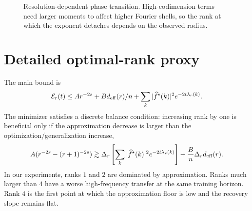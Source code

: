 \documentclass[10pt]{article}
\newcommand{\wh}{\widehat}
\newcommand{\cE}{\mathcal{E}}
\begin{document}
\begin{figure}[t]
\centering
{}
\caption{Resolution-dependent phase transition.  High-codimension terms need larger moments to affect higher Fourier shells, so the rank at which the exponent detaches depends on the observed radius.}
\label{fig:app_phase}
\end{figure}

\section{Detailed optimal-rank proxy}
The main bound is
\begin{equation}
\cE_r(t)\le A r^{-2s}+B d_{\rm eff}(r)/n+\sum_k |\wh f^\star(k)|^2 e^{-2t\lambda_r(k)}.
\end{equation}
The minimizer satisfies a discrete balance condition: increasing rank by one is beneficial only if the approximation decrease is larger than the optimization/generalization increase,
\begin{equation}
A(r^{-2s}-(r+1)^{-2s})
\gtrsim \Delta_r\left[\sum_k |\wh f^\star(k)|^2 e^{-2t\lambda_r(k)}\right]
+\frac{B}{n}\Delta_r d_{\rm eff}(r).
\end{equation}
In our experiments, ranks $1$ and $2$ are dominated by approximation.  Ranks much larger than $4$ have a worse high-frequency transfer at the same training horizon.  Rank $4$ is the first point at which the approximation floor is low and the recovery slope remains flat.
\end{document}
